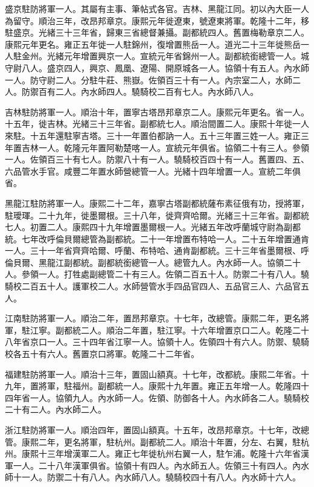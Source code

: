 \begin{pinyinscope}
盛京駐防將軍一人。其屬有主事、筆帖式各官。吉林、黑龍江同。初以內大臣一人為留守。順治三年，改昂邦章京。康熙元年徙遼東，號遼東將軍。乾隆十二年，移駐盛京。光緒三十三年省，歸東三省總督兼攝。副都統四人。舊置梅勒章京二人。康熙元年更名。雍正五年徙一人駐錦州，復增置熊岳一人。道光二十三年徙熊岳一人駐金州。光緒元年增置興京一人。宣統元年省錦州一人。副都統銜總管一人。城守尉八人。盛京四人，興京、鳳凰、遼陽、開原城各一人。協領十有五人。內水師一人。防守尉二人。分駐牛莊、熊嶽。佐領百三十有一人。內宗室二人，水師二人。防禦百有二人。內水師四人。驍騎校二百有七人。內水師八人。

吉林駐防將軍一人。順治十年，置寧古塔昂邦章京二人。康熙元年更名。省一人。十五年，徙吉林。光緒三十三年省。副都統七人。順治間置二人。康熙十年徙一人來駐。十五年還駐寧吉塔。三十一年置伯都訥一人。五十三年置三姓一人。雍正三年置吉林一人。乾隆元年置阿勒楚喀一人。宣統元年俱省。協領二十有三人。參領一人。佐領百三十有七人。防禦八十有一人。驍騎校百四十有一人。舊置四、五、六品管水手官。咸豐二年置水師營總管一人。光緒十四年增置一人。宣統二年俱省。

黑龍江駐防將軍一人。康熙二十二年，嘉寧古塔副都統薩布素征俄有功，授將軍，駐璦琿。二十九年，徙墨爾根。三十八年，徙齊齊哈爾。光緒三十三年省。副都統七人。初置二人。康熙四十九年增置墨爾根一人。光緒五年改呼蘭城守尉為副都統。七年改呼倫貝爾總管為副都統。二十一年增置布特哈一人。二十五年增置通肯一人。三十一年省齊齊哈爾、呼蘭、布特哈、通肯副都統。三十三年省墨爾根、呼倫貝爾、黑龍江副都統。副都統銜總管一人。總管九人。內水師一人。協領二十人。參領一人。打牲處副總管二十有三人。佐領二百五十人。防禦二十有八人。驍騎校二百五十人。護軍校二人。水師營管水手四品官四人、五品官三人、六品官五人。

江南駐防將軍一人。順治二年，置昂邦章京。十七年，改總管。康熙二年，更名將軍，駐江寧。副都統二人。順治二年置，駐江寧。十六年增置京口二人。乾隆二十八年省京口一人。三十四年省江寧一人。協領十人。佐領四十有六人。防禦、驍騎校各五十有六人。舊置京口將軍。乾隆二十二年省。

福建駐防將軍一人。順治十三年，置固山額真。十七年，改都統。康熙二年省。十九年，置將軍，駐福州。副都統一人。康熙十九年置。雍正五年增一人。乾隆四十四年省一人。協領九人。內水師一人。佐領、防御各十人。內水師各二人。驍騎校二十有二人。內水師二人。

浙江駐防將軍一人。順治四年，置固山額真。十五年，改昂邦章京。十七年，改總管。康熙二年，更名將軍，駐杭州。副都統二人。順治十年置，分左、右翼，駐杭州。康熙十三年增漢軍二人。雍正七年徙杭州右翼一人，駐乍浦。乾隆十六年省漢軍一人。二十八年漢軍俱省。協領十有四人。內水師五人。佐領三十有四人。內水師十一人。防禦二十有八人。內水師八人。驍騎校四十有八人。內水師十六人。


\end{pinyinscope}

